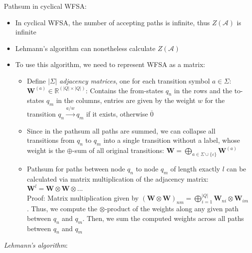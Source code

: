 Pathsum in cyclical WFSA:
\begin{itemize}
    \item In cyclical WFSA, the number of accepting paths is infinite, thus $Z(\mathcal{A})$ is infinite
    \item Lehmann's algorithm can nonetheless calculate $Z(\mathcal{A})$
    \item To use this algorithm, we need to represent WFSA as a matrix:
        \begin{itemize}
            \item Define $|\Sigma|$ \emph{adjacency matrices}, one for each transition symbol $a \in \Sigma$: $\boldsymbol{W}^{(a)} \in \mathbb{R}^{(|Q| \times |Q|)}$: Contains the from-states $q_n$ in the rows and the to-states $q_m$ in the columns, entries are given by the weight $w$ for the transition $q_n \xrightarrow{a /w}  q_m$ if it exists, otherwise $\overline{0}$
            \item Since in the pathsum all paths are summed, we can collapse all transitions from $q_n$ to $q_m$ into a single transition without a label, whose weight is the $\oplus$-sum of all original transitions:
            $
            \boldsymbol{W} = \bigoplus_{a \in \Sigma \cup \{\varepsilon\}} \boldsymbol{W}^{(a)}
            $
            \item Pathsum for paths between node $q_n$ to node $q_m$ of length exactly $l$ can be calculated via matrix multiplication of the adjacency matrix: $\boldsymbol{W}^l = \boldsymbol{W} \otimes \boldsymbol{W} \otimes ...$\\
            Proof: Matrix multiplication given by $(\boldsymbol{W} \otimes \boldsymbol{W})_{nm} = \bigoplus_{i=1}^{|Q|} \boldsymbol{W}_{ni} \otimes \boldsymbol{W}_{im}$. Thus, we compute the $\otimes$-product of the weights along any given path between $q_n$ and $q_m$. Then, we sum the computed weights across all paths between $q_n$ and $q_m$
        \end{itemize}
\end{itemize}
\emph{Lehmann's algorithm}:
